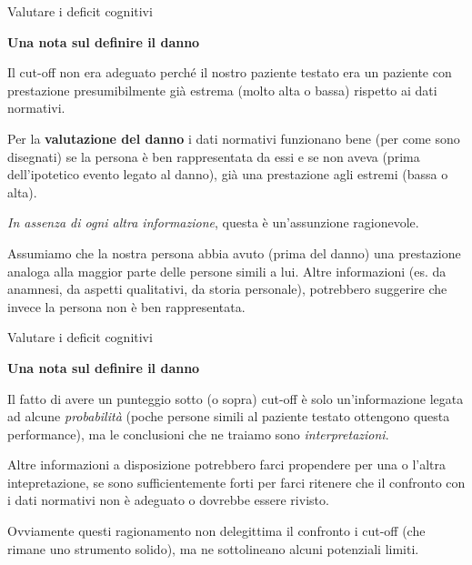 \documentclass[
  ignorenonframetext,
]{beamer}
\begin{document}
\begin{frame}{Valutare i deficit cognitivi}
\label{valutare-i-deficit-cognitivi-13}
\begin{center}
  \textbf{Una nota sul definire il danno}
\end{center}

\small

Il cut-off non era adeguato perché il nostro paziente testato era un
paziente con prestazione presumibilmente già estrema (molto alta o
bassa) rispetto ai dati normativi.

Per la \textbf{valutazione del danno} i dati normativi funzionano bene
(per come sono disegnati) se la persona è ben rappresentata da essi e se
non aveva (prima dell'ipotetico evento legato al danno), già una
prestazione agli estremi (bassa o alta).

\emph{In assenza di ogni altra informazione}, questa è un'assunzione
ragionevole.

Assumiamo che la nostra persona abbia avuto (prima del danno) una
prestazione analoga alla maggior parte delle persone simili a lui. Altre
informazioni (es. da anamnesi, da aspetti qualitativi, da storia
personale), potrebbero suggerire che invece la persona non è ben
rappresentata.
\end{frame}

\begin{frame}{Valutare i deficit cognitivi}
\label{valutare-i-deficit-cognitivi-14}
\begin{center}
  \textbf{Una nota sul definire il danno}
\end{center}

Il fatto di avere un punteggio sotto (o sopra) cut-off è solo
un'informazione legata ad alcune \emph{probabilità} (poche persone
simili al paziente testato ottengono questa performance), ma le
conclusioni che ne traiamo sono \emph{interpretazioni}.

Altre informazioni a disposizione potrebbero farci propendere per una o
l'altra intepretazione, se sono sufficientemente forti per farci
ritenere che il confronto con i dati normativi non è adeguato o dovrebbe
essere rivisto.

Ovviamente questi ragionamento non delegittima il confronto i cut-off
(che rimane uno strumento solido), ma ne sottolineano alcuni potenziali
limiti.
\end{frame}
\end{document}
